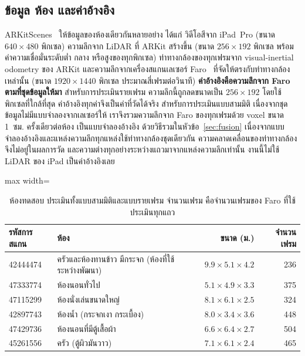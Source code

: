 \subsection{ข้อมูล ห้อง และค่าอ้างอิง}\label{sec:data}
ARKitScenes~\cite{arkitscenes} ให้ข้อมูลของห้องเดียวกันหลายอย่าง ได้แก่ วิดีโอสีจาก iPad~Pro
(ขนาด $640\times480$ พิกเซล) ความลึกจาก LiDAR ที่ ARKit สร้างขึ้น (ขนาด $256\times192$ พิกเซล
พร้อมค่าความเชื่อมั่นระดับต่ำ กลาง หรือสูงของทุกพิกเซล) ท่าทางกล้องของทุกเฟรมจาก visual-inertial odometry ของ ARKit
และความลึกจากเครื่องสแกนเลเซอร์ Faro~\cite{faro} ที่จัดให้ตรงกับท่าทางกล้องเหล่านั้น
(ขนาด $1920\times1440$ พิกเซล ประมาณสี่เฟรมต่อวินาที) \textbf{ค่าอ้างอิงคือความลึกจาก Faro ตามที่ชุดข้อมูลให้มา}
สำหรับการประเมินรายเฟรม ความลึกนี้ถูกลดขนาดเป็น $256\times192$ โดยใช้พิกเซลที่ใกล้ที่สุด
ค่าอ้างอิงทุกค่าจึงเป็นค่าที่วัดได้จริง สำหรับการประเมินแบบสามมิติ เนื่องจากชุดข้อมูลไม่มีแบบจำลองจากเลเซอร์ให้
เราจึงรวมความลึกจาก Faro ของทุกเฟรมด้วย voxel ขนาด 1~ซม. ครั้งเดียวต่อห้อง เป็นแบบจำลองอ้างอิง
ด้วยวิธีรวมในหัวข้อ~\ref{sec:fusion} เนื่องจากแบบจำลองอ้างอิงและแหล่งความลึกทุกแหล่งใช้ท่าทางกล้องชุดเดียวกัน
ความคลาดเคลื่อนของท่าทางกล้องจึงไม่อยู่ในผลการวัด และความต่างทุกอย่างระหว่างแถวมาจากแหล่งความลึกเท่านั้น
งานนี้ไม่ใช้ LiDAR ของ iPad เป็นค่าอ้างอิงเลย

\begin{table}[t]
\centering\small
\caption{ห้องทดสอบ ประเมินทั้งแบบสามมิติและแบบรายเฟรม จำนวนเฟรม คือจำนวนเฟรมของ Faro ที่ใช้ประเมินทุกแถว}
\label{tab:scenes}
\begin{adjustbox}{max width=\columnwidth}
\begin{tabular}{@{}llrr@{}}
\toprule
รหัสการสแกน & ห้อง & ขนาด (ม.) & จำนวนเฟรม \\
\midrule
42444474 & ครัวและห้องทานข้าว มีกระจก (ห้องที่ใช้ระหว่างพัฒนา) & $9.9\times5.1\times4.2$ & 236 \\
47333774 & ห้องนอนทั่วไป & $5.1\times4.9\times3.3$ & 375 \\
47115299 & ห้องนั่งเล่นขนาดใหญ่ & $8.1\times6.1\times2.5$ & 324 \\
42897743 & ห้องน้ำ (กระจกเงา กระเบื้อง) & $8.0\times3.4\times3.6$ & 448 \\
47429736 & ห้องนอนที่มีตู้เสื้อผ้า & $6.6\times6.4\times2.7$ & 504 \\
45261556 & ครัว (ตู้ผิวมันวาว) & $7.1\times6.1\times2.4$ & 465 \\
\bottomrule
\end{tabular}
\end{adjustbox}
\end{table}

